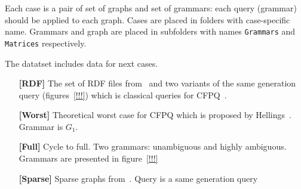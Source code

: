 Each case is a pair of set of graphs and set of grammars: each query (grammar) should be applied to each graph.
Cases are placed in folders with case-specific name.
Grammars and graph are placed in subfolders with names \verb|Grammars| and \verb|Matrices| respectively.

The datatset includes data for next cases.
\begin{itemize}
\item[\textbf{[RDF]}] The set of RDF files from~\cite{RDF} and two variants of the same generation query (figures~\ref{!!!}) which is classical queries for CFPQ~\cite{!!!}.

\item[\textbf{[Worst]}] Theoretical worst case for CFPQ which is proposed by Hellings~\cite{!!!Hellings}.
Grammar is $G_1$.

\item[\textbf{[Full]}] Cycle to full.
Two grammars: unambiguous and highly ambiguous. 
Grammars are presented in figure~\ref{!!!}

\item[\textbf{[Sparse]}] Sparse graphs from~\cite{fan2018scaling}. 
Query is a same generation query

\end{itemize}




